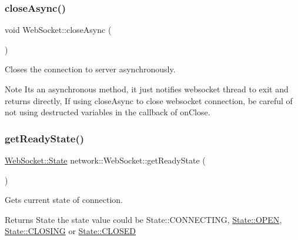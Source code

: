 \subsubsection{\texorpdfstring{close\+Async()}{closeAsync()}\hspace{0.1cm}{\footnotesize\ttfamily [2/2]}}
{\footnotesize\ttfamily void Web\+Socket\+::close\+Async (\begin{DoxyParamCaption}{ }\end{DoxyParamCaption})}



Closes the connection to server asynchronously. 

\begin{DoxyNote}{Note}
It\textquotesingle{}s an asynchronous method, it just notifies websocket thread to exit and returns directly, If using \textquotesingle{}close\+Async\textquotesingle{} to close websocket connection, be careful of not using destructed variables in the callback of \textquotesingle{}on\+Close\textquotesingle{}. 
\end{DoxyNote}
\mbox{\label{classnetwork_1_1WebSocket_aa4367a2657c9b3c82b3a8afc4f563524}} 
\subsubsection{\texorpdfstring{get\+Ready\+State()}{getReadyState()}\hspace{0.1cm}{\footnotesize\ttfamily [1/2]}}
{\footnotesize\ttfamily \hyperlink{classnetwork_1_1WebSocket_a60680efaa16031262c8c50409356aa20}{Web\+Socket\+::\+State} network\+::\+Web\+Socket\+::get\+Ready\+State (\begin{DoxyParamCaption}{ }\end{DoxyParamCaption})}



Gets current state of connection. 

\begin{DoxyReturn}{Returns}
State the state value could be State\+::\+C\+O\+N\+N\+E\+C\+T\+I\+NG, \hyperlink{classnetwork_1_1WebSocket_a60680efaa16031262c8c50409356aa20aa38bd5138bf35514df41a1795ebbf5c3}{State\+::\+O\+P\+EN}, \hyperlink{classnetwork_1_1WebSocket_a60680efaa16031262c8c50409356aa20aa71a44c4c886bfc66b1edd511e6a677e}{State\+::\+C\+L\+O\+S\+I\+NG} or \hyperlink{classnetwork_1_1WebSocket_a60680efaa16031262c8c50409356aa20a110ccf2f5d2ff4eda1fd1a494293467d}{State\+::\+C\+L\+O\+S\+ED} 
\end{DoxyReturn}
\mbox{\label{classnetwork_1_1WebSocket_aebd52c7b7089db891e191e19dc474506}} 

